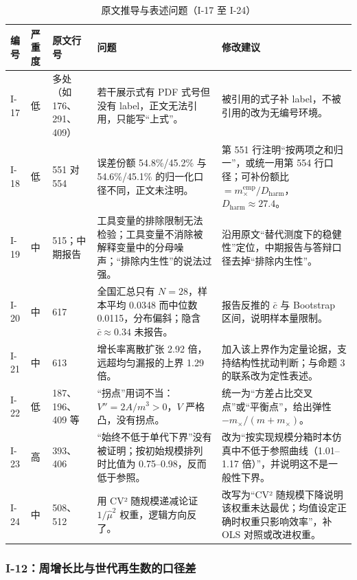 \begin{table}[!tbp]
\centering
\footnotesize
\caption{原文推导与表述问题（I-17 至 I-24）}
\label{tab:ck-issues-c}
\setlength{\tabcolsep}{3pt}
\begin{tabular}{L{0.9cm}L{0.8cm}L{1.9cm}L{5.6cm}L{5.8cm}}
\toprule
编号 & 严重度 & 原文行号 & 问题 & 修改建议 \\
\midrule
I-17 & 低 & 多处（如 176、291、409） & 若干展示式有 PDF 式号但没有 label，正文无法引用，只能写“上式”。 & 被引用的式子补 label，不被引用的改为无编号环境。 \\
I-18 & 低 & 551 对 554 & 误差份额 54.8\%/45.2\% 与 54.6\%/45.1\% 的归一化口径不同，正文未注明。 & 第 551 行注明“按两项之和归一”，或统一用第 554 行口径；可补份额比 $=m_\times^{\mathrm{emp}}/D_{\mathrm{harm}}$，$D_{\mathrm{harm}}\approx27.4$。 \\
I-19 & 中 & 515；中期报告 & 工具变量的排除限制无法检验；工具变量不消除被解释变量中的分母噪声；“排除内生性”的说法过强。 & 沿用原文“替代测度下的稳健性”定位，中期报告与答辩口径去掉“排除内生性”。 \\
I-20 & 中 & 617 & 全国汇总只有 $N=28$，样本平均 0.0348 而中位数 0.0115，分布偏斜；隐含 $\bar c\approx0.34$ 未报告。 & 报告反推的 $\bar c$ 与 Bootstrap 区间，说明样本量限制。 \\
I-21 & 中 & 613 & 增长率离散扩张 2.92 倍，远超均匀漏报的上界 1.29 倍。 & 加入该上界作为定量论据，支持结构性扰动判断；与命题 3 的联系改为定性表述。 \\
I-22 & 低 & 187、196、409 等 & “拐点”用词不当：$V''=2A/m^3>0$，$V$ 严格凸，没有拐点。 & 统一为“方差占比交叉点”或“平衡点”，给出弹性 $-m_\times/(m+m_\times)$。 \\
I-23 & 高 & 393、406 & “始终不低于单代下界”没有被证明；按初始规模排列时比值为 0.75--0.98，反而低于参照。 & 改为“按实现规模分箱时本仿真中不低于参照曲线（1.01--1.17 倍）”，并说明这不是一般性下界。 \\
I-24 & 中 & 508、512 & 用 CV² 随规模递减论证 $1/\hat\mu^2$ 权重，逻辑方向反了。 & 改写为“CV² 随规模下降说明该权重未达最优；均值设定正确时权重只影响效率”，补 OLS 对照或改进权重。 \\
\bottomrule
\end{tabular}
\end{table}

\subsubsection{I-12：周增长比与世代再生数的口径差}

